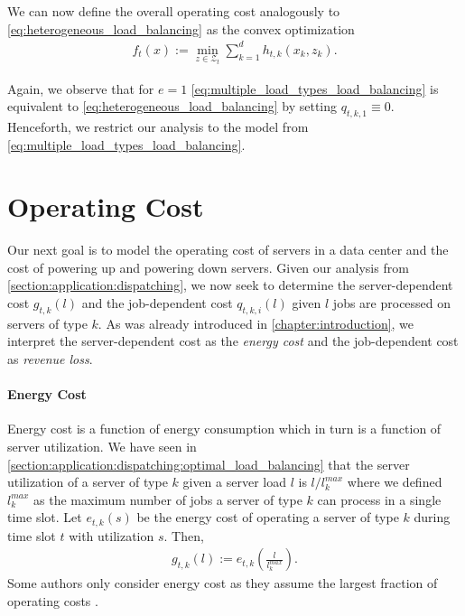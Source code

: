 We can now define the overall operating cost analogously to \autoref{eq:heterogeneous_load_balancing} as the convex optimization \begin{align}\label{eq:multiple_load_types_load_balancing}
    f_t(x) := \min_{z \in \mathcal{Z}_t} \sum_{k=1}^d h_{t,k}(x_k,z_k).
\end{align}

Again, we observe that for $e = 1$ \autoref{eq:multiple_load_types_load_balancing} is equivalent to \autoref{eq:heterogeneous_load_balancing} by setting $q_{t,k,1} \equiv 0$. Henceforth, we restrict our analysis to the model from \autoref{eq:multiple_load_types_load_balancing}.

\section{Operating Cost}\label{section:application:operating_cost}

Our next goal is to model the operating cost of servers in a data center and the cost of powering up and powering down servers. Given our analysis from \autoref{section:application:dispatching}, we now seek to determine the server-dependent cost $g_{t,k}(l)$ and the job-dependent cost $q_{t,k,i}(l)$ given $l$ jobs are processed on servers of type $k$. As was already introduced in \autoref{chapter:introduction}, we interpret the server-dependent cost as the \textit{energy cost} and the job-dependent cost as \textit{revenue loss}.

\paragraph{Energy Cost} Energy cost is a function of energy consumption which in turn is a function of server utilization. We have seen in \autoref{section:application:dispatching:optimal_load_balancing} that the server utilization of a server of type $k$ given a server load $l$ is $l / l_k^{max}$ where we defined $l_k^{max}$ as the maximum number of jobs a server of type $k$ can process in a single time slot. Let $e_{t,k}(s)$ be the energy cost of operating a server of type $k$ during time slot $t$ with utilization $s$. Then, \begin{align*}
    g_{t,k}(l) := e_{t,k}\left(\frac{l}{l_k^{max}}\right).
\end{align*} Some authors only consider energy cost as they assume the largest fraction of operating costs \cite{Bansal2015}.

